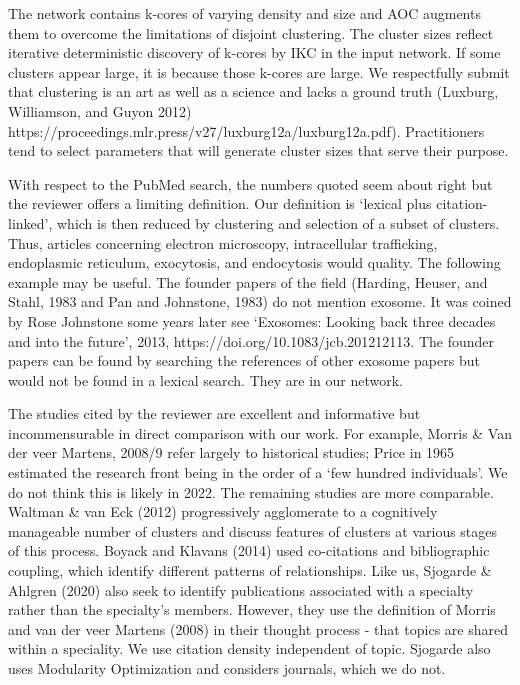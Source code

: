 \documentclass[11pt, oneside]{article}   	%
\begin{document}
\vspace{2 mm} 
The network contains k-cores of varying density and size and AOC augments them to overcome the limitations of disjoint clustering. The cluster sizes reflect iterative deterministic discovery of k-cores by IKC in the input network. If some clusters appear large, it is because those k-cores are large. We respectfully submit that clustering is an art as well as a science and lacks a ground truth (Luxburg, Williamson, and Guyon 2012) 
https://proceedings.mlr.press/v27/luxburg12a/luxburg12a.pdf). Practitioners tend to select parameters that will generate cluster sizes that serve their purpose. 

With respect to the PubMed search, the numbers quoted seem about right but the reviewer offers a limiting definition. Our definition is `lexical plus citation-linked', which is then reduced by clustering and selection of a subset of clusters. Thus, articles concerning electron microscopy, intracellular trafficking, endoplasmic reticulum, exocytosis, and endocytosis would quality. The following example may be useful. The founder papers of the field (Harding, Heuser, and Stahl, 1983 and Pan and Johnstone, 1983) do not mention exosome. It was coined by Rose Johnstone some years later see `Exosomes: Looking back three decades and into the future', 2013, https://doi.org/10.1083/jcb.201212113. The founder papers can be found by searching the references of other exosome papers but would not be found in a lexical search. They are in our network.


The studies cited by the reviewer are excellent and informative but incommensurable in direct comparison with our work. For example, Morris \& Van der veer Martens, 2008/9 refer largely to historical studies; Price in 1965 estimated  the research front being in the order of a `few hundred individuals'. We do not think this is likely in 2022. The remaining studies are more comparable. Waltman \& van Eck (2012) progressively agglomerate to a cognitively manageable number of clusters and discuss features of clusters at various stages of this process. Boyack and Klavans (2014) used co-citations and bibliographic coupling, which identify different patterns of relationships. Like us, Sjogarde \& Ahlgren (2020) also seek to identify publications associated with a specialty rather than the specialty's members. However, they use the definition of Morris and van der veer Martens (2008) in their thought process - that topics are shared within a speciality. We use citation density independent of topic. Sjogarde also uses Modularity Optimization and considers journals, which we do not.
\end{document}
